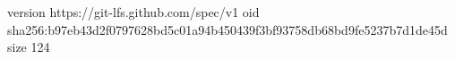 version https://git-lfs.github.com/spec/v1
oid sha256:b97eb43d2f0797628bd5c01a94b450439f3bf93758db68bd9fe5237b7d1de45d
size 124
